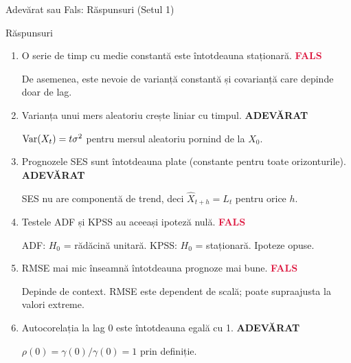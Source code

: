 \documentclass[9pt, aspectratio=169, t]{beamer}
\begin{document}
\begin{frame}{Adevărat sau Fals: Răspunsuri (Setul 1)}
    \begin{exampleblock}{Răspunsuri}
    \begin{enumerate}
        \item O serie de timp cu medie constantă este întotdeauna staționară. \hfill \textbf{\textcolor{Crimson}{FALS}}

        {\small \textcolor{MediumGray}{De asemenea, este nevoie de varianță constantă și covarianță care depinde doar de lag.}}

        \vspace{0.15cm}

        \item Varianța unui mers aleatoriu crește liniar cu timpul. \hfill \textbf{\textcolor{Forest}{ADEVĂRAT}}

        {\small \textcolor{MediumGray}{$\text{Var}(X_t) = t\sigma^2$ pentru mersul aleatoriu pornind de la $X_0$.}}

        \vspace{0.15cm}

        \item Prognozele SES sunt întotdeauna plate (constante pentru toate orizonturile). \hfill \textbf{\textcolor{Forest}{ADEVĂRAT}}

        {\small \textcolor{MediumGray}{SES nu are componentă de trend, deci $\hat{X}_{t+h} = L_t$ pentru orice $h$.}}

        \vspace{0.15cm}

        \item Testele ADF și KPSS au aceeași ipoteză nulă. \hfill \textbf{\textcolor{Crimson}{FALS}}

        {\small \textcolor{MediumGray}{ADF: $H_0$ = rădăcină unitară. KPSS: $H_0$ = staționară. Ipoteze opuse.}}

        \vspace{0.15cm}

        \item RMSE mai mic înseamnă întotdeauna prognoze mai bune. \hfill \textbf{\textcolor{Crimson}{FALS}}

        {\small \textcolor{MediumGray}{Depinde de context. RMSE este dependent de scală; poate supraajusta la valori extreme.}}

        \vspace{0.15cm}

        \item Autocorelația la lag 0 este întotdeauna egală cu 1. \hfill \textbf{\textcolor{Forest}{ADEVĂRAT}}

        {\small \textcolor{MediumGray}{$\rho(0) = \gamma(0)/\gamma(0) = 1$ prin definiție.}}
    \end{enumerate}
    \end{exampleblock}
\end{frame}
\end{document}

